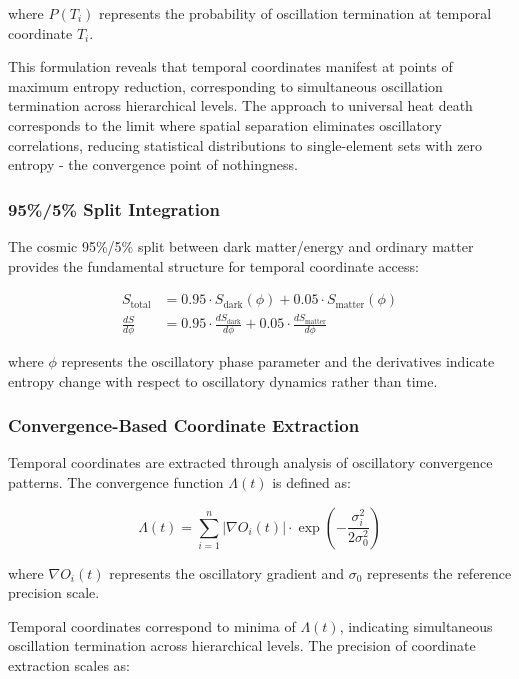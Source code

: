 \documentclass[11pt,a4paper]{article}
\theoremstyle{remark}
\begin{document}
where $P(T_i)$ represents the probability of oscillation termination at temporal coordinate $T_i$.

This formulation reveals that temporal coordinates manifest at points of maximum entropy reduction, corresponding to simultaneous oscillation termination across hierarchical levels. The approach to universal heat death corresponds to the limit where spatial separation eliminates oscillatory correlations, reducing statistical distributions to single-element sets with zero entropy - the convergence point of nothingness.

\subsubsection{95\%/5\% Split Integration}

The cosmic 95\%/5\% split between dark matter/energy and ordinary matter provides the fundamental structure for temporal coordinate access:

\begin{align}
S_{\text{total}} &= 0.95 \cdot S_{\text{dark}}(\phi) + 0.05 \cdot S_{\text{matter}}(\phi) \\
\frac{dS}{d\phi} &= 0.95 \cdot \frac{dS_{\text{dark}}}{d\phi} + 0.05 \cdot \frac{dS_{\text{matter}}}{d\phi}
\end{align}

where $\phi$ represents the oscillatory phase parameter and the derivatives indicate entropy change with respect to oscillatory dynamics rather than time.

\subsubsection{Convergence-Based Coordinate Extraction}

Temporal coordinates are extracted through analysis of oscillatory convergence patterns. The convergence function $\Lambda(t)$ is defined as:

\begin{equation}
\Lambda(t) = \sum_{i=1}^{n} |\nabla O_i(t)| \cdot \exp\left(-\frac{\sigma_i^2}{2\sigma_0^2}\right)
\end{equation}

where $\nabla O_i(t)$ represents the oscillatory gradient and $\sigma_0$ represents the reference precision scale.

Temporal coordinates correspond to minima of $\Lambda(t)$, indicating simultaneous oscillation termination across hierarchical levels. The precision of coordinate extraction scales as:
\end{document}
